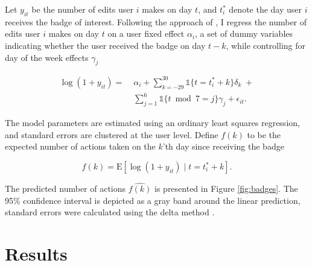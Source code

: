 \documentclass[conference]{IEEEtran}
\newcommand{\1}{\mathds{1}}
\newcommand{\E}{\mathrm{E}}
\begin{document}


Let $y_{it}$ be the number of edits user $i$ makes on day $t$, and $t_i^*$ denote the day user $i$ receives the badge of interest. Following the approach of \citet{Jacobson1993}, I regress the number of edits user $i$ makes on day $t$ on a user fixed effect $\alpha_i$, a set of dummy variables indicating whether the user received the badge on day $t-k$, while controlling for day of the week effects $\gamma_j$

\begin{equation}
\begin{split}
\log(1 + y_{it}) = \; & \alpha_i + \sum_{k=-29}^{30} \1 \{ t = t_i^* + k \} \delta_k \; + \\
  & \sum_{j=1}^6 \1 \{ t \bmod 7 = j \} \gamma_j + \epsilon_{it}.
\end{split}
\end{equation}

The model parameters are estimated using an ordinary least squares regression, and standard errors are clustered at the user level. Define $f(k)$ to be the expected number of actions taken on the $k$'th day since receiving the badge

\begin{equation}
f(k) = \E \left[ \log(1 + y_{it}) \; | \; t=t^*_i + k \right].
\end{equation}

The predicted number of actions $\hat{f(k)}$ is presented in Figure \ref{fig:badges}. The 95\% confidence interval is depicted as a gray band around the linear prediction, standard errors were calculated using the delta method \citep{Williams2012}.

\section{Results}
\end{document}
